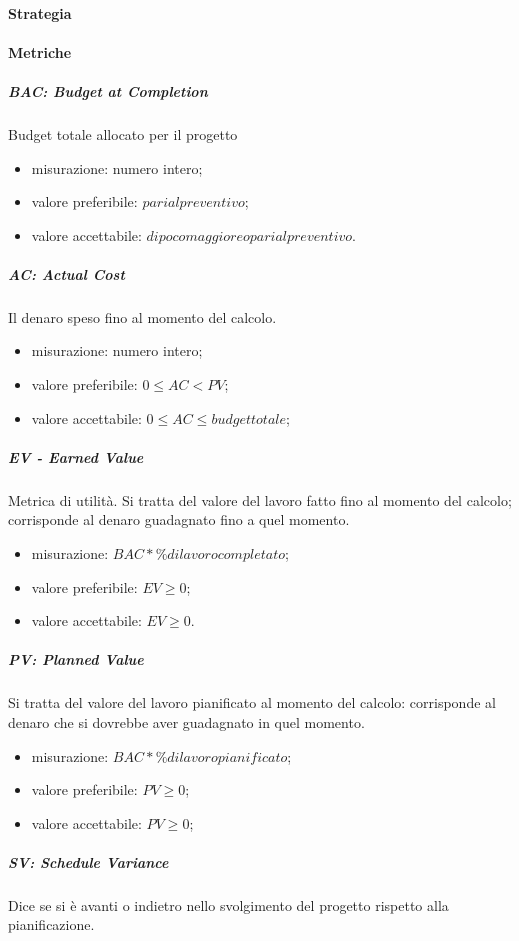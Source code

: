 		\paragraph{Strategia}
		\paragraph{Metriche}
			\subparagraph{BAC: Budget at Completion}
			Budget totale allocato per il progetto
			\begin{itemize}
				\item misurazione: numero intero;
				\item valore preferibile: $pari al preventivo$;
				\item valore accettabile: $di poco maggiore o pari al preventivo$.
			\end{itemize}
			\subparagraph{AC: Actual Cost}
			Il denaro speso fino al momento del calcolo.
			\begin{itemize}
				\item  misurazione: numero intero;
				\item  valore preferibile: $0 \leq AC < PV$;
				\item  valore accettabile: $0 \leq AC \leq budget totale$;
			\end{itemize}
			\subparagraph{EV - Earned Value}
			Metrica di utilità. Si tratta del valore del lavoro fatto fino al momento del calcolo; corrisponde al denaro guadagnato fino a quel momento.
			\begin{itemize}
				\item  misurazione: $BAC * \% di lavoro completato$;
				\item  valore preferibile: $EV \geq 0$;
				\item  valore accettabile: $EV \geq 0$.
			\end{itemize}
			\subparagraph{PV: Planned Value}
			Si tratta del valore del lavoro pianificato al momento del calcolo: corrisponde al denaro che si dovrebbe aver guadagnato in quel momento.
			\begin{itemize}
				\item  misurazione: $BAC * \% di lavoro pianificato$;
				\item  valore preferibile: $PV \geq 0$;
				\item  valore accettabile: $PV \geq 0$;
			\end{itemize}			
			\subparagraph{SV: Schedule Variance}
			Dice se si è avanti o indietro nello svolgimento del progetto rispetto alla pianificazione.
